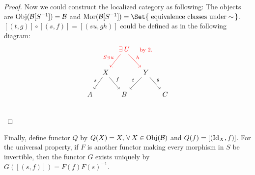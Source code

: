 \begin{theorem}
\begin{proof}
  Now we could construct the localized category as following:
  The objects are $\operatorname{Obj}(\mathcal{B}[S^{-1}]) = \mathcal{B}$ and
  $\Mor(\Bc[S^{-1}]) = \Set{ \text{ equivalence classes under} \sim \, }$.
  $[(t, g)] \circ [(s, f)] = [(su, gh)]$ could be defined as in the following
  diagram:
  \[ \begin{tikzcd}[column sep=tiny]
      & & {\color{red} \exists U}
      \ar[ld, "S \ni u"', red] \ar[rd, "h", red] & {\footnotesize \color{red} \text{by 2.}} & \\
      & X \ar[ld, "s"'] \ar[rd, "f"] & & Y \ar[ld, "t"'] \ar[rd, "g"] & \\
      A & & B & & C \\
    \end{tikzcd} \]
  \end{proof}

  Finally, define functor $Q$ by $Q(X) = X, \, \forall X \in \Obj(\Bc)$
  and $Q(f) = [({\rm Id}_X, f)]$. For the universal property, if $F$
  is another functor making every morphism in $S$ be invertible,
  then the functor $G$ exists uniquely by $G([(s, f)]) = F(f) F(s)^{-1}$.
\end{theorem}
